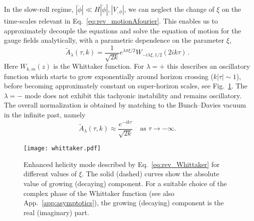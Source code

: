 In the slow-roll regime, $|\ddot \phi| \ll H |\dot \phi|, | V_{,\phi}|$, we can neglect the change of $\xi$ on the time-scales relevant in Eq.~\eqref{eq:rev_motionAfourier}. This enables us to approximately decouple the equations and solve the equation of motion for the gauge fields analytically, with a parametric dependence on the parameter $\xi$,
\begin{equation}
 \tilde A_\lambda(\tau,k) = \frac{1}{\sqrt{2k}} e^{\lambda \pi \xi/2} W_{- i \lambda \xi, 1/2}(2 i k \tau) \,.
 \label{eq:rev_Whittaker}
\end{equation}
Here $W_{k,m}(z)$ is the Whittaker function. For $\lambda = +$ this describes an oscillatory function which starts to grow exponentially around horizon crossing ($k |\tau| \sim 1$), before becoming approximately constant on super-horizon scales, see Fig.~\ref{fig:Whittakerabelian}. The $\lambda = -$ mode does not exhibit this tachyonic instability and remains oscillatory.
The overall normalization is obtained by matching to the Bunch--Davies vacuum in the infinite past, namely 
\begin{equation}
\tilde{A}_{\lambda}(\tau,k)\approx\frac{e^{-ik\tau}}{\sqrt{2k}}\quad\textrm{as }\tau\to-\infty.\label{eq:BDvac}
\end{equation}

\begin{figure}
 \center
 \texttt{[image: whittaker.pdf]}
 \caption{Enhanced helicity mode described by Eq.~\eqref{eq:rev_Whittaker} for different values of $\xi$. The solid (dashed) curves show the absolute value of growing (decaying) component. For a suitable choice of the complex phase of the Whittaker function (see also App.~\ref{app:asymptotics}), the growing (decaying) component is the real (imaginary) part.}
 \label{fig:Whittakerabelian}
\end{figure}


